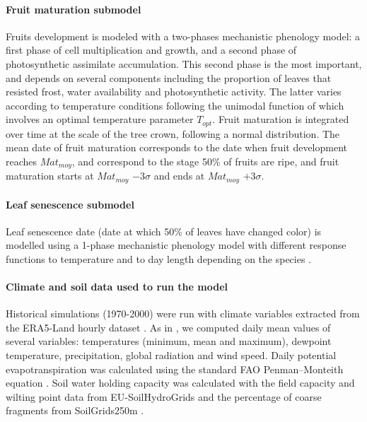 \paragraph{Fruit maturation submodel}

Fruits development is modeled with a two-phases mechanistic phenology model:  a first phase of cell multiplication and growth, and a second phase of photosynthetic assimilate accumulation. This second phase is the most important, and depends on several components including the proportion of leaves that resisted frost, water availability and photosynthetic activity. The latter varies according to temperature conditions following the unimodal function of \citet{Wang1998} which involves an optimal temperature parameter $T_{opt}$.  Fruit maturation is integrated over time at the scale of the tree crown, following a normal distribution. The mean date of fruit maturation corresponds to the date when fruit development reaches $Mat_{moy}$, and correspond to the stage 50\% of fruits are ripe,  and fruit maturation starts at $Mat_{moy}$ $-3\sigma$ and ends at $Mat_{moy}$ $+3\sigma$.

\paragraph{Leaf senescence submodel}
Leaf senescence date (date at which 50\% of leaves have changed color) is modelled using a 1-phase mechanistic phenology model with different response functions to temperature and to day length depending on the species \citep{Delpierre2009}. 

\paragraph{Climate and soil data used to run the model}

Historical simulations (1970-2000) were run with climate variables extracted from the ERA5-Land hourly dataset \citep{MunozSabater2021}. As in \citet{VanderMeersch2023}, we computed daily mean values of several variables: temperatures (minimum, mean and maximum), dewpoint temperature, precipitation, global radiation and wind speed. Daily potential evapotranspiration was calculated using the standard FAO Penman–Monteith equation \citep{Allen1998}. Soil water holding capacity was calculated with the field capacity and wilting point data from EU-SoilHydroGrids \citep{Toth2017} and the percentage of coarse fragments from SoilGrids250m \citep{Hengl2017}.

